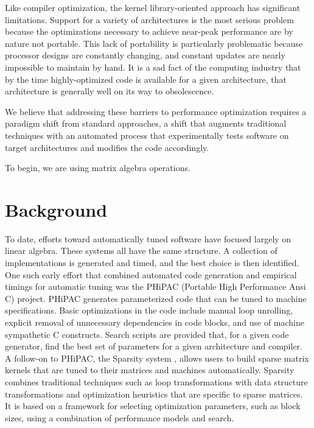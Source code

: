 \documentclass[11pt]{article}
\begin{document}
Like compiler optimization, the kernel library-oriented approach has significant limitations.  Support for a variety of architectures is the most serious problem because the optimizations necessary to achieve near-peak performance are by nature not portable.   This lack of portability is particularly problematic because processor designs are constantly changing,  and constant updates are nearly impossible to maintain by hand.  It is a sad fact of the computing industry that by the time highly-optimized code is available for a given architecture, that architecture is generally well on its way to obsolescence.

We believe that addressing these barriers to performance optimization requires a paradigm shift from standard approaches, a shift that augments traditional techniques with an automated process that experimentally tests software on target architectures and modifies the code accordingly.


To begin, we are using matrix algebra operations.

\section{Background}
\label{sec:background}

To date, efforts toward automatically tuned software have focused largely on linear algebra.  These systems all have the same structure.  A collection of implementations is generated and timed, and the best choice is then identified.  One such early effort that combined automated code generation and empirical timings for automatic tuning was the PHiPAC (Portable High Performance Ansi C) \cite{lawn111} project.  PHiPAC generates parameterized code that can be tuned to machine specifications.  Basic optimizations in the code include manual loop unrolling, explicit removal of unnecessary dependencies in code blocks, and use of machine sympathetic C constructs. Search scripts are provided that, for a given code generator, find the best set of parameters for a given architecture and compiler. A follow-on to PHiPAC, the Sparsity system \cite{SPARSITY}, allows users to build sparse matrix kernels that are tuned to their matrices and machines automatically. Sparsity combines traditional techniques such as loop transformations with data structure transformations and optimization heuristics that are specific to sparse  matrices. It is based on a framework for selecting optimization parameters, such as block sizes, using a combination of performance models and search.
\end{document}
